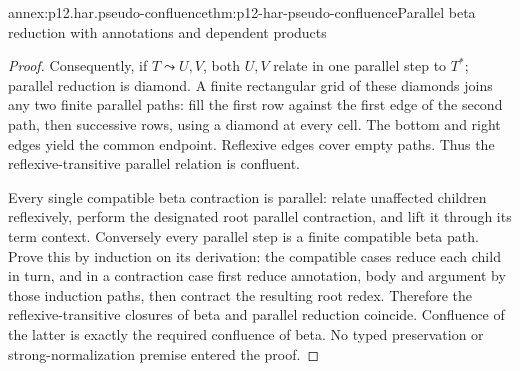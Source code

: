 \begin{annexitem}{annex:p12.har.pseudo-confluence}{thm:p12-har-pseudo-confluence}{Parallel beta reduction with annotations and dependent products}
\begin{proof}
Consequently, if \(T\leadsto U,V\), both \(U,V\) relate in
one parallel step to \(T^*\); parallel reduction is diamond.
A finite rectangular grid of these diamonds joins any two finite
parallel paths: fill the first row against the first edge of the second
path, then successive rows, using a diamond at every cell. The bottom
and right edges yield the common endpoint. Reflexive edges cover empty
paths. Thus the reflexive-transitive parallel relation is confluent.

Every single compatible beta contraction is parallel: relate unaffected
children reflexively, perform the designated root parallel contraction,
and lift it through its term context. Conversely every parallel step
is a finite compatible beta path. Prove this by induction on its
derivation: the compatible cases reduce each child in turn, and in a
contraction case first reduce annotation, body and argument by those
induction paths, then contract the resulting root redex. Therefore the
reflexive-transitive closures of beta and parallel reduction coincide.
Confluence of the latter is exactly the required confluence of beta.
No typed preservation or strong-normalization premise entered the proof.
\end{proof}
\end{annexitem}

